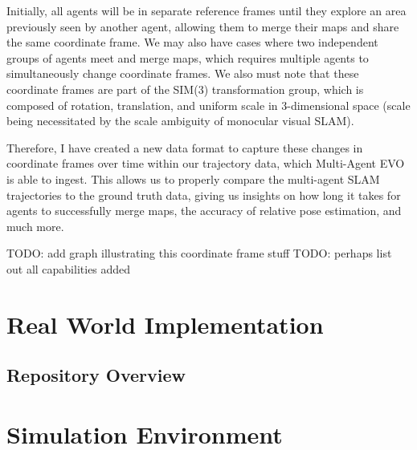 Initially, all agents will be in separate reference frames until they explore an area previously seen by another agent, allowing them to merge their maps and share the same coordinate frame. We may also have cases where two independent groups of agents meet and merge maps, which requires multiple agents to simultaneously change coordinate frames. We also must note that these coordinate frames are part of the SIM(3) transformation group, which is composed of rotation, translation, and uniform scale in 3-dimensional space (scale being necessitated by the scale ambiguity of monocular visual SLAM).

Therefore, I have created a new data format to capture these changes in coordinate frames over time within our trajectory data, which Multi-Agent EVO is able to ingest. This allows us to properly compare the multi-agent SLAM trajectories to the ground truth data, giving us insights on how long it takes for agents to successfully merge maps, the accuracy of relative pose estimation, and much more.

TODO: add graph illustrating this coordinate frame stuff
TODO: perhaps list out all capabilities added

\section{Real World Implementation}
\label{sec:real-world-implementation}

\subsection{Repository Overview}
\label{sec:repository-overview}

\section{Simulation Environment}
\label{sec:simulation-environment}





